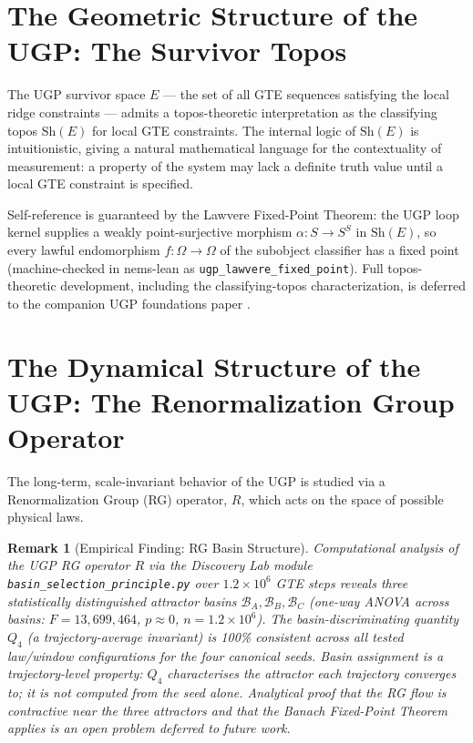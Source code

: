 \documentclass[11pt,twocolumn]{article}
\newtheorem{remark}{Remark}[section]
\begin{document}
\section{The Geometric Structure of the UGP: The Survivor Topos}
\label{sec:geometric_structure}

The UGP survivor space $E$ --- the set of all GTE sequences satisfying the local ridge constraints --- admits a topos-theoretic interpretation as the classifying topos $\mathrm{Sh}(E)$ for local GTE constraints. The internal logic of $\mathrm{Sh}(E)$ is intuitionistic, giving a natural mathematical language for the contextuality of measurement: a property of the system may lack a definite truth value until a local GTE constraint is specified.

Self-reference is guaranteed by the Lawvere Fixed-Point Theorem: the UGP loop kernel supplies a weakly point-surjective morphism $\alpha: S \to S^S$ in $\mathrm{Sh}(E)$, so every lawful endomorphism $f: \Omega \to \Omega$ of the subobject classifier has a fixed point (machine-checked in nems-lean as \texttt{ugp\_lawvere\_fixed\_point}). Full topos-theoretic development, including the classifying-topos characterization, is deferred to the companion UGP foundations paper \cite{SpivackUGPFormalization}.

\section{The Dynamical Structure of the UGP: The Renormalization Group Operator}
\label{sec:dynamical_structure}
The long-term, scale-invariant behavior of the UGP is studied via a Renormalization Group (RG) operator, $R$, which acts on the space of possible physical laws.

\begin{remark}[Empirical Finding: RG Basin Structure]
\label{rem:rg_basins}
Computational analysis of the UGP RG operator $R$ via the Discovery Lab module \texttt{basin\_selection\_principle.py} over $1.2\times10^6$ GTE steps reveals three statistically distinguished attractor basins $\mathcal{B}_A, \mathcal{B}_B, \mathcal{B}_C$ (one-way ANOVA across basins: $F = 13{,}699{,}464$, $p \approx 0$, $n = 1.2\times10^6$). The basin-discriminating quantity $Q_4$ (a trajectory-average invariant) is 100\% consistent across all tested law/window configurations for the four canonical seeds. Basin assignment is a trajectory-level property: $Q_4$ characterises the attractor each trajectory converges to; it is not computed from the seed alone. Analytical proof that the RG flow is contractive near the three attractors and that the Banach Fixed-Point Theorem applies is an open problem deferred to future work.
\end{remark}
\end{document}

